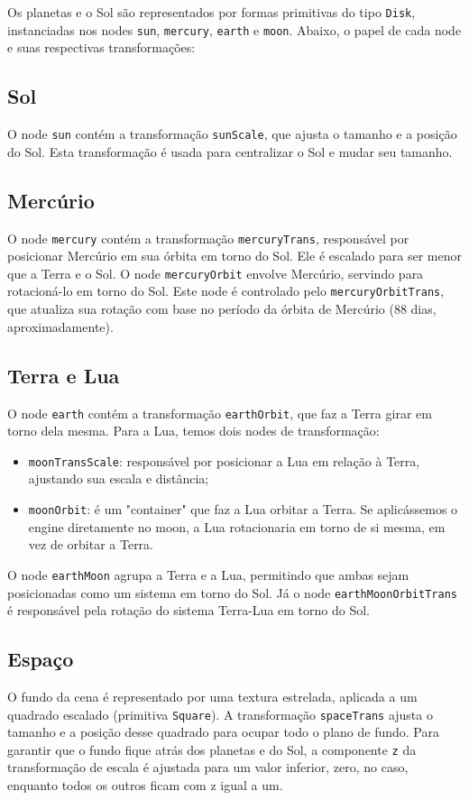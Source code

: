 \documentclass[11pt, a4paper]{article}
\begin{document}
Os planetas e o Sol são representados por formas primitivas do tipo 
\texttt{Disk}, instanciadas nos nodes \texttt{sun}, \texttt{mercury}, 
\texttt{earth} e \texttt{moon}. Abaixo, o papel de cada node e suas 
respectivas transformações:

\subsection{Sol}
O node \texttt{sun} contém a transformação \texttt{sunScale}, que ajusta o 
tamanho e a posição do Sol. Esta transformação é usada para centralizar o Sol e 
mudar seu tamanho.

\subsection{Mercúrio}
O node \texttt{mercury} contém a transformação \texttt{mercuryTrans}, responsável 
por posicionar Mercúrio em sua órbita em torno do Sol. Ele é escalado para ser 
menor que a Terra e o Sol. O node \texttt{mercuryOrbit} envolve Mercúrio, 
servindo para rotacioná-lo em torno do Sol. Este node é controlado pelo
\texttt{mercuryOrbitTrans}, que atualiza sua rotação com base no período da 
órbita de Mercúrio (88 dias, aproximadamente).

\subsection{Terra e Lua}
O node \texttt{earth} contém a transformação \texttt{earthOrbit}, que faz a 
Terra girar em torno dela mesma. Para a Lua, temos dois nodes de transformação:

\begin{itemize}
\item \texttt{moonTransScale}: responsável por posicionar a Lua em relação à Terra, 
ajustando sua escala e distância;
\item \texttt{moonOrbit}: é um "container" que faz a Lua orbitar a Terra. Se
aplicássemos o engine diretamente no moon, a Lua rotacionaria em 
torno de si mesma, em vez de orbitar a Terra.
\end{itemize}

O node \texttt{earthMoon} agrupa a Terra e a Lua, permitindo que ambas sejam 
posicionadas como um sistema em torno do Sol. Já o node 
\texttt{earthMoonOrbitTrans} é responsável pela rotação do sistema Terra-Lua em 
torno do Sol.

\subsection{Espaço}
O fundo da cena é representado por uma textura estrelada, aplicada a um quadrado 
escalado (primitiva \texttt{Square}). A transformação \texttt{spaceTrans} ajusta 
o tamanho e a posição desse quadrado para ocupar todo o plano de fundo. Para 
garantir que o fundo fique atrás dos planetas e do Sol, a componente \texttt{z} 
da transformação de escala é ajustada para um valor inferior, zero, no caso,
enquanto todos os outros ficam com z igual a um.
\end{document}
